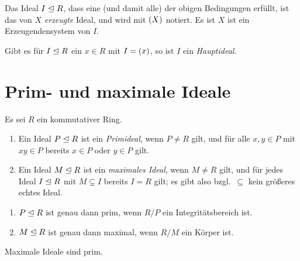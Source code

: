 \begin{definition}
  Das Ideal $I \mathrel{\trianglelefteq} R$, dass eine \textup(und damit alle\textup) der obigen Bedingungen erfüllt, ist das von $X$ \emph{erzeugte} Ideal, und wird mit $(X)$ notiert.
  Es ist $X$ ist ein Erzeugendensystem von $I$.
\end{definition}

\begin{definition}
  Gibt es für $I \mathrel{\trianglelefteq} R$ ein $x \in R$ mit $I = (x)$, so ist $I$ ein \emph{Hauptideal}.
\end{definition}





\section{Prim- und maximale Ideale}

Es sei $R$ ein kommutativer Ring.

\begin{definition}
  \begin{enumerate}
    \item
      Ein Ideal $P \mathrel{\trianglelefteq} R$ ist ein \emph{Primideal}, wenn $P \neq R$ gilt, und für alle $x,y \in P$ mit $xy \in P$ bereits $x \in P$ oder $y \in P$ gilt.
    \item
      Ein Ideal $M \mathrel{\trianglelefteq} R$ ist ein \emph{maximales Ideal}, wenn $M \neq R$ gilt, und für jedes Ideal $I \mathrel{\trianglelefteq} R$ mit $M \subsetneq I$ bereits $I = R$ gilt;
      es gibt also bzgl.\ $\subseteq$ kein größeres echtes Ideal.
  \end{enumerate}
\end{definition}

\begin{lemma}
  \begin{enumerate}
    \item
      $P \mathrel{\trianglelefteq} R$ ist genau dann prim, wenn $R/P$ ein Integritätsbereich ist.
    \item
      $M \mathrel{\trianglelefteq} R$ ist genau dann maximal, wenn $R/M$ ein Körper ist.
  \end{enumerate}
\end{lemma}

\begin{corollary}
  Maximale Ideale sind prim.
\end{corollary}


